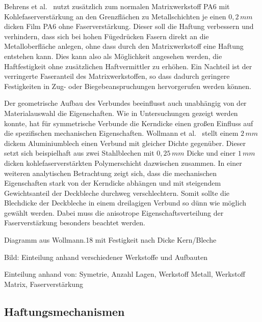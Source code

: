 Behrens et al.~\cite{BerndArno.2017} nutzt zusätzlich zum normalen Matrixwerkstoff PA6 mit Kohlefaserverstärkung an den Grenzflächen zu Metallschichten je einen $0,2 \, mm$ dicken Film PA6 ohne Faserverstärkung.
Dieser soll die Haftung verbessern und verhindern, dass sich bei hohen Fügedrücken Fasern direkt an die Metalloberfläche anlegen, ohne dass durch den Matrixwerkstoff eine Haftung entstehen kann.
Dies kann also als Möglichkeit angesehen werden, die Haftfestigkeit ohne zusätzlichen Haftvermittler zu erhöhen.
Ein Nachteil ist der verringerte Faseranteil des Matrixwerkstoffen, so dass dadurch geringere Festigkeiten in Zug- oder Biegebeanspruchungen hervorgerufen werden können.


Der geometrische Aufbau des Verbundes beeinflusst auch unabhängig von der Materialauswahl die Eigenschaften.
Wie in Untersuchungen gezeigt werden konnte, hat für symmetrische Verbunde die Kerndicke einen großen Einfluss auf die spezifischen mechanischen Eigenschaften.
Wollmann et al.~\cite{Wollmann.2018} stellt einem $2\,mm$ dickem Aluminiumblech einen Verbund mit gleicher Dichte gegenüber.
Dieser setzt sich beispielhaft aus zwei Stahlblechen mit $0,25\,mm$ Dicke und einer $1\,mm$ dicken kohlefaserverstärkten Polymerschicht dazwischen zusammen.
In einer weiteren analytischen Betrachtung zeigt sich, dass die mechanischen Eigenschaften stark von der Kerndicke abhängen und mit steigendem Gewichtsanteil der Deckbleche durchweg verschlechtern.
Somit sollte die Blechdicke der Deckbleche in einem dreilagigen Verbund so dünn wie möglich gewählt werden.
Dabei muss die anisotrope Eigenschaftsverteilung der Faserverstärkung besonders beachtet werden.

Diagramm aus Wollmann.18 mit Festigkeit nach Dicke Kern/Bleche


Bild: Einteilung anhand verschiedener Werkstoffe und Aufbauten


Einteilung anhand von: Symetrie, Anzahl Lagen, Werkstoff Metall, Werkstoff Matrix, Faserverstärkung

\subsection{Haftungsmechanismen}\label{subsec:haftung}


